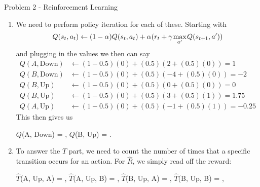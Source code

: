 \begin{problem}{Problem 2 - Reinforcement Learning}
    \begin{highlight}
        \begin{enumerate}[label=(\alph*)]
            \item We need to perform policy iteration for each of these. Starting with
            \begin{equation*}
                Q(s_{t}, a_{t}) \leftarrow (1 - \alpha)Q(s_{t}, a_{t}) + \alpha(r_{t} + \gamma \hspace*{1pt} \underset{a'}{\text{max}} \hspace*{1pt} Q(s_{t + 1}, a'))
            \end{equation*}
            and plugging in the values we then can say
            \setcounter{equation}{-1}
            \begin{align}
                Q(A, \text{Down}) & \leftarrow (1 - 0.5)(0) + (0.5)(2 + (0.5)(0)) = 1 \\
                Q(B, \text{Down}) & \leftarrow (1 - 0.5)(0) + (0.5)(-4 + (0.5)(0)) = -2 \\
                Q(B, \text{Up}) & \leftarrow (1 - 0.5)(0) + (0.5)(0 + (0.5)(0)) = 0 \\
                Q(B, \text{Up}) & \leftarrow (1 - 0.5)(0) + (0.5)(3 + (0.5)(1)) = 1.75 \\
                Q(A, \text{Up}) & \leftarrow (1 - 0.5)(0) + (0.5)(-1 + (0.5)(1)) = -0.25
            \end{align}
            This then gives us
            \begin{center}
                $Q$(A, Down) = \underline{\color{green}{1}} \hspace*{5pt} , \hspace*{5pt} $Q$(B, Up) = \underline{\color{green}{1.75}}.
            \end{center}
            \item To answer the $\hat{T}$ part, we need to count the number of times that a specific transition occurs for an action. For $\hat{R}$, we simply read off the reward:
            \begin{center}
                $\hat{T}$(A, Up, A) = \underline{\color{green}{1}}, \hspace*{2pt} $\hat{T}$(A, Up, B) = \underline{\color{green}{0}}, \hspace*{2pt} $\hat{T}$(B, Up, A) = \underline{\color{green}{0.5}}, \hspace*{2pt} $\hat{T}$(B, Up, B) = \underline{\color{green}{0.5}}, \hspace*{2pt}

\end{center}
\end{enumerate}
\end{highlight}
\end{problem}
